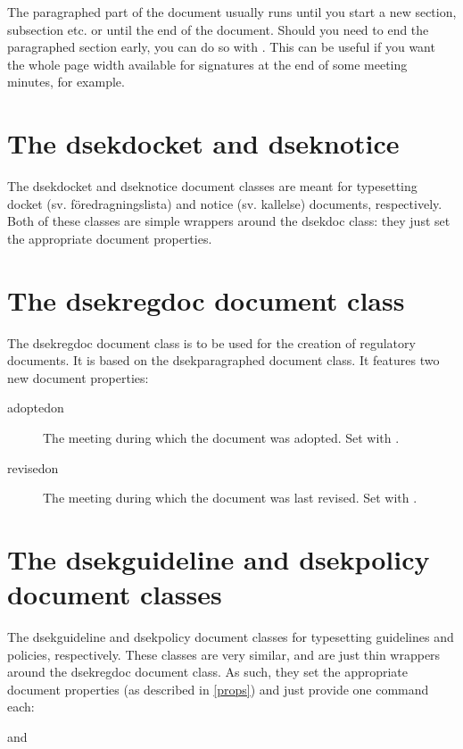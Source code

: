 \documentclass[a4paper, oneside]{ltxdoc}
\begin{document}
The paragraphed part of the document usually runs until you start a new section,
subsection etc. or until the end of the document.  Should you need to end the
paragraphed section early, you can do so with .  This can be
useful if you want the whole page width available for signatures at the end of
some meeting minutes, for example.

\section{The \textsf{dsekdocket} and \textsf{dseknotice}}
The \textsf{dsekdocket} and \textsf{dseknotice} document classes are meant for
typesetting docket (sv. föredragningslista) and notice (sv. kallelse) documents,
respectively.  Both of these classes are simple wrappers around the
\textsf{dsekdoc} class: they just set the appropriate document properties.

\section{The \textsf{dsekregdoc} document class}
The \textsf{dsekregdoc} document class is to be used for the creation of
regulatory documents.  It is based on the \textsf{dsekparagraphed} document
class.  It features two new document properties:

\begin{description}
\item[adoptedon] The meeting during which the document was adopted.  Set with
  .
\item[revisedon] The meeting during which the document was last revised.  Set
  with .
\end{description}

\section{The \textsf{dsekguideline} and \textsf{dsekpolicy} document classes}
The \textsf{dsekguideline} and \textsf{dsekpolicy} document classes for
typesetting guidelines and policies, respectively.  These classes are very
similar, and are just thin wrappers around the \textsf{dsekregdoc} document
class.  As such, they set the appropriate document properties (as described in
\ref{props}) and just provide one command each:

\begin{center}
   and 
\end{center}
\end{document}
